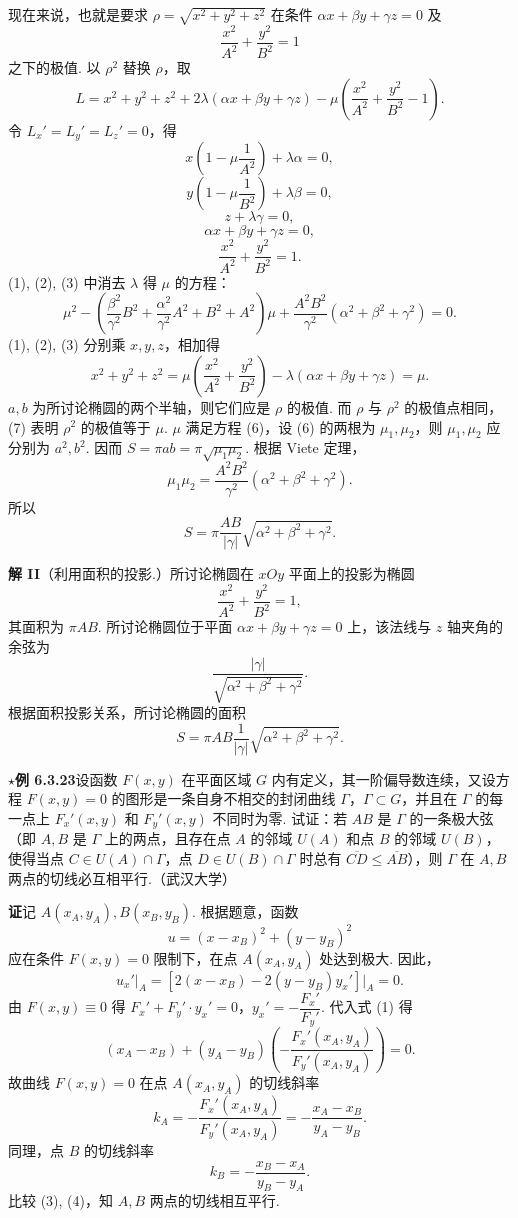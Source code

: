 \documentclass[UTF8,12pt,a4paper,fontset=fandol]{ctexart}
\begin{document}
现在来说，也就是要求 $\rho=\sqrt{x^2+y^2+z^2}$ 在条件 $\alpha x+\beta y+\gamma z=0$ 及
\[
  \frac{x^2}{A^2}+\frac{y^2}{B^2}=1
\]
之下的极值. 以 $\rho^2$ 替换 $\rho$，取
\[
  L=x^2+y^2+z^2+2\lambda(\alpha x+\beta y+\gamma z)
  -\mu\left(\frac{x^2}{A^2}+\frac{y^2}{B^2}-1\right).
\]
令 $L_x'=L_y'=L_z'=0$，得
\[
  x\left(1-\mu\frac1{A^2}\right)+\lambda\alpha=0, \tag{1}
\]
\[
  y\left(1-\mu\frac1{B^2}\right)+\lambda\beta=0, \tag{2}
\]
\[
  z+\lambda\gamma=0, \tag{3}
\]
\[
  \alpha x+\beta y+\gamma z=0, \tag{4}
\]
\[
  \frac{x^2}{A^2}+\frac{y^2}{B^2}=1. \tag{5}
\]
(1), (2), (3) 中消去 $\lambda$ 得 $\mu$ 的方程：
\[
  \mu^2-\left(\frac{\beta^2}{\gamma^2}B^2+
  \frac{\alpha^2}{\gamma^2}A^2+B^2+A^2\right)\mu
  +\frac{A^2B^2}{\gamma^2}(\alpha^2+\beta^2+\gamma^2)=0. \tag{6}
\]
(1), (2), (3) 分别乘 $x,y,z$，相加得
\[
  x^2+y^2+z^2=\mu\left(\frac{x^2}{A^2}+\frac{y^2}{B^2}\right)
  -\lambda(\alpha x+\beta y+\gamma z)=\mu. \tag{7}
\]
$a,b$ 为所讨论椭圆的两个半轴，则它们应是 $\rho$ 的极值. 而 $\rho$ 与 $\rho^2$ 的极值点相同，(7) 表明 $\rho^2$ 的极值等于 $\mu$. $\mu$ 满足方程 (6)，设 (6) 的两根为 $\mu_1,\mu_2$，则 $\mu_1,\mu_2$ 应分别为 $a^2,b^2$. 因而 $S=\pi ab=\pi\sqrt{\mu_1\mu_2}$. 根据 Viete 定理，
\[
  \mu_1\mu_2=\frac{A^2B^2}{\gamma^2}(\alpha^2+\beta^2+\gamma^2).
\]
所以
\[
  S=\pi\frac{AB}{|\gamma|}\sqrt{\alpha^2+\beta^2+\gamma^2}.
\]

\noindent\textbf{解 II}\quad （利用面积的投影.）所讨论椭圆在 $xOy$ 平面上的投影为椭圆
\[
  \frac{x^2}{A^2}+\frac{y^2}{B^2}=1,
\]
其面积为 $\pi AB$. 所讨论椭圆位于平面 $\alpha x+\beta y+\gamma z=0$ 上，该法线与 $z$ 轴夹角的余弦为
\[
  \frac{|\gamma|}{\sqrt{\alpha^2+\beta^2+\gamma^2}}.
\]
根据面积投影关系，所讨论椭圆的面积
\[
  S=\pi AB\frac1{|\gamma|}\sqrt{\alpha^2+\beta^2+\gamma^2}.
\]

\noindent\textbf{\ensuremath{\star}例 6.3.23}\quad 设函数 $F(x,y)$ 在平面区域 $G$ 内有定义，其一阶偏导数连续，又设方程 $F(x,y)=0$ 的图形是一条自身不相交的封闭曲线 $\Gamma$，$\Gamma\subset G$，并且在 $\Gamma$ 的每一点上 $F_x'(x,y)$ 和 $F_y'(x,y)$ 不同时为零. 试证：若 $AB$ 是 $\Gamma$ 的一条极大弦（即 $A,B$ 是 $\Gamma$ 上的两点，且存在点 $A$ 的邻域 $U(A)$ 和点 $B$ 的邻域 $U(B)$，使得当点 $C\in U(A)\cap\Gamma$，点 $D\in U(B)\cap\Gamma$ 时总有 $\overline{CD}\le\overline{AB}$），则 $\Gamma$ 在 $A,B$ 两点的切线必互相平行.（武汉大学）

\noindent\textbf{证}\quad 记 $A(x_A,y_A),B(x_B,y_B)$. 根据题意，函数
\[
  u=(x-x_B)^2+(y-y_B)^2
\]
应在条件 $F(x,y)=0$ 限制下，在点 $A(x_A,y_A)$ 处达到极大. 因此，
\[
  u_x'\big|_A=\left[2(x-x_B)-2(y-y_B)y_x'\right]\big|_A=0. \tag{1}
\]
由 $F(x,y)\equiv0$ 得 $F_x'+F_y'\cdot y_x'=0$，$y_x'=-\dfrac{F_x'}{F_y'}$. 代入式 (1) 得
\[
  (x_A-x_B)+(y_A-y_B)\left(-\frac{F_x'(x_A,y_A)}{F_y'(x_A,y_A)}\right)=0. \tag{2}
\]
故曲线 $F(x,y)=0$ 在点 $A(x_A,y_A)$ 的切线斜率
\[
  k_A=-\frac{F_x'(x_A,y_A)}{F_y'(x_A,y_A)}
  =-\frac{x_A-x_B}{y_A-y_B}. \tag{3}
\]
同理，点 $B$ 的切线斜率
\[
  k_B=-\frac{x_B-x_A}{y_B-y_A}. \tag{4}
\]
比较 (3), (4)，知 $A,B$ 两点的切线相互平行.
\end{document}

